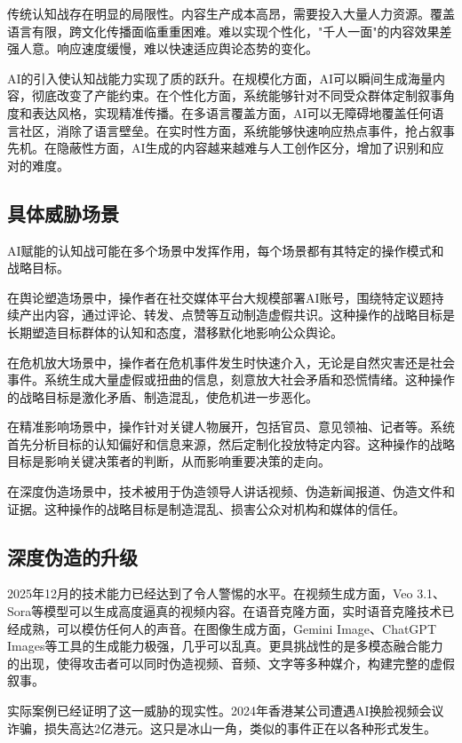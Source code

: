 传统认知战存在明显的局限性。内容生产成本高昂，需要投入大量人力资源。覆盖语言有限，跨文化传播面临重重困难。难以实现个性化，"千人一面"的内容效果差强人意。响应速度缓慢，难以快速适应舆论态势的变化。

AI的引入使认知战能力实现了质的跃升。在规模化方面，AI可以瞬间生成海量内容，彻底改变了产能约束。在个性化方面，系统能够针对不同受众群体定制叙事角度和表达风格，实现精准传播。在多语言覆盖方面，AI可以无障碍地覆盖任何语言社区，消除了语言壁垒。在实时性方面，系统能够快速响应热点事件，抢占叙事先机。在隐蔽性方面，AI生成的内容越来越难与人工创作区分，增加了识别和应对的难度。

\subsection{具体威胁场景}

AI赋能的认知战可能在多个场景中发挥作用，每个场景都有其特定的操作模式和战略目标。

在舆论塑造场景中，操作者在社交媒体平台大规模部署AI账号，围绕特定议题持续产出内容，通过评论、转发、点赞等互动制造虚假共识。这种操作的战略目标是长期塑造目标群体的认知和态度，潜移默化地影响公众舆论。

在危机放大场景中，操作者在危机事件发生时快速介入，无论是自然灾害还是社会事件。系统生成大量虚假或扭曲的信息，刻意放大社会矛盾和恐慌情绪。这种操作的战略目标是激化矛盾、制造混乱，使危机进一步恶化。

在精准影响场景中，操作针对关键人物展开，包括官员、意见领袖、记者等。系统首先分析目标的认知偏好和信息来源，然后定制化投放特定内容。这种操作的战略目标是影响关键决策者的判断，从而影响重要决策的走向。

在深度伪造场景中，技术被用于伪造领导人讲话视频、伪造新闻报道、伪造文件和证据。这种操作的战略目标是制造混乱、损害公众对机构和媒体的信任。

\subsection{深度伪造的升级}

2025年12月的技术能力已经达到了令人警惕的水平。在视频生成方面，Veo 3.1、Sora等模型可以生成高度逼真的视频内容。在语音克隆方面，实时语音克隆技术已经成熟，可以模仿任何人的声音。在图像生成方面，Gemini Image、ChatGPT Images等工具的生成能力极强，几乎可以乱真。更具挑战性的是多模态融合能力的出现，使得攻击者可以同时伪造视频、音频、文字等多种媒介，构建完整的虚假叙事。

实际案例已经证明了这一威胁的现实性。2024年香港某公司遭遇AI换脸视频会议诈骗，损失高达2亿港元。这只是冰山一角，类似的事件正在以各种形式发生。


